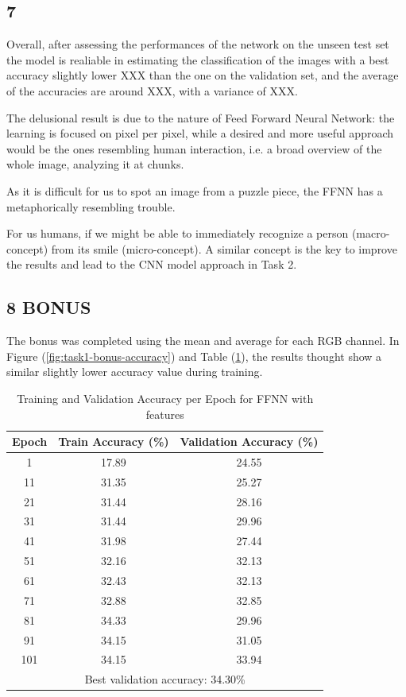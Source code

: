 \documentclass[11pt]{scrartcl}
\begin{document}
\subsection*{7}

Overall, after assessing the performances of the network on the unseen test set
the model is realiable in estimating the classification of the images with
a best accuracy slightly lower XXX than the one on the validation set,
and the average of the accuracies are around XXX,
with a variance of XXX.

The delusional result is due to the nature of Feed Forward Neural Network:
the learning is focused on pixel per pixel,
while a desired and more useful approach would be the ones resembling human interaction,
i.e. a broad overview of the whole image,
analyzing it at chunks.

As it is difficult for us to spot an image from a puzzle piece,
the FFNN has a metaphorically resembling trouble.

For us humans, if we might be able to immediately recognize a person (macro-concept) 
from its smile (micro-concept).
A similar concept is the key to improve the results 
and lead to the CNN model approach in Task 2.


\subsection*{8 BONUS}

The bonus was completed using the mean and average for each RGB channel.
In Figure (\ref{fig:task1-bonus-accuracy}) 
and Table (\ref{tab:task1-bonus-accuracy}), 
the results thought show a similar slightly lower accuracy value during training.

\begin{table}[htbp]
\centering
\caption{Training and Validation Accuracy per Epoch for FFNN with features}
\begin{tabular}{ccc}
\toprule
\textbf{Epoch} & \textbf{Train Accuracy (\%)} & \textbf{Validation Accuracy (\%)} \\
\midrule
1    & 17.89  & 24.55  \\
11   & 31.35  & 25.27  \\
21   & 31.44  & 28.16  \\
31   & 31.44  & 29.96  \\
41   & 31.98  & 27.44  \\
51   & 32.16  & 32.13  \\
61   & 32.43  & 32.13  \\
71   & 32.88  & 32.85  \\
81   & 34.33  & 29.96  \\
91   & 34.15  & 31.05  \\
101  & 34.15  & 33.94  \\
\midrule
\multicolumn{3}{c}{Best validation accuracy: 34.30\%} \\
\bottomrule
\end{tabular}
\label{tab:task1-bonus-accuracy}
\end{table}
\end{document}
